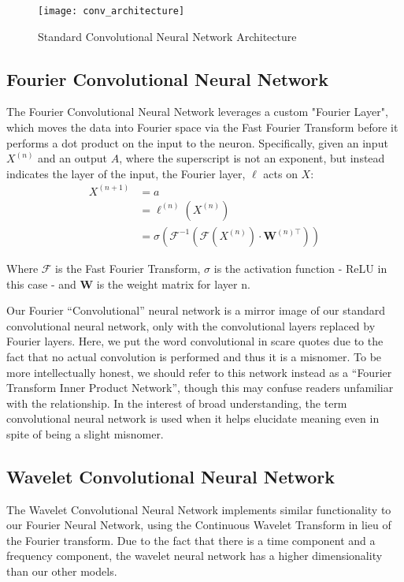 \begin{figure}[ht]
\caption{Standard Convolutional Neural Network Architecture}
\label{fig:conv net}
\texttt{[image: conv\_architecture]}
\centering
\end{figure}

\subsection{Fourier Convolutional Neural Network}
The Fourier Convolutional Neural Network leverages a custom "Fourier Layer", which moves the data into Fourier space via the Fast Fourier Transform before it performs a dot product on the input to the neuron.
Specifically, given an input $X^{(n)}$ and an output $A$, where the superscript is not an exponent, but instead indicates the layer of the input, the Fourier layer, $\ell$ acts on $X$: 
\begin{align*}
X^{(n+1)} & = a \\
& = \ell^{(n)}(X^{(n)}) \\
& = \sigma(\mathcal{F}^{-1}(\mathcal{F}(X^{(n)})\cdot \mathbf{W}^{(n)\top}))
\end{align*}

Where $\mathcal{F}$ is the Fast Fourier Transform, $\sigma$ is the activation function - ReLU in this case - and $\mathbf{W}$ is the weight matrix for layer n.

Our Fourier ``Convolutional'' neural network is a mirror image of our standard convolutional neural network, only with the convolutional layers replaced by Fourier layers.
Here, we put the word convolutional in scare quotes due to the fact that no actual convolution is performed and thus it is a misnomer.
To be more intellectually honest, we should refer to this network instead as a ``Fourier Transform Inner Product Network'', though this may confuse readers unfamiliar with the relationship.
In the interest of broad understanding, the term convolutional neural network is used when it helps elucidate meaning even in spite of being a slight misnomer.

\subsection{Wavelet Convolutional Neural Network} \label{wavelet cnn}
The Wavelet Convolutional Neural Network implements similar functionality to our Fourier Neural Network, using the Continuous Wavelet Transform in lieu of the Fourier transform.
Due to the fact that there is a time component and a frequency component, the wavelet neural network has a higher dimensionality than our other models. 

